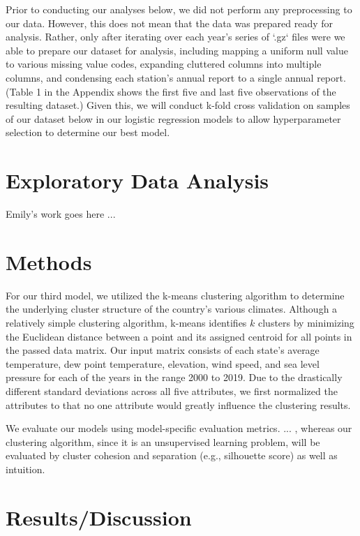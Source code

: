 \documentclass[conference]{IEEEtran}
\begin{document}
Prior to conducting our analyses below, we did not perform any preprocessing to our data. However, this does not mean that the data was prepared ready for analysis. Rather, only after iterating over each year's series of `.gz` files were we able to prepare our dataset for analysis, including mapping a uniform null value to various missing value codes, expanding cluttered columns into multiple columns, and condensing each station's annual report to a single annual report. (Table 1 in the Appendix shows the first five and last five observations of the resulting dataset.) Given this, we will conduct k-fold cross validation on samples of our dataset below in our logistic regression models to allow hyperparameter selection to determine our best model.

\section{Exploratory Data Analysis}

Emily's work goes here ...

\section{Methods}

For our third model, we utilized the k-means clustering algorithm to determine the underlying cluster structure of the country's various climates. Although a relatively simple clustering algorithm, k-means identifies $k$ clusters by minimizing the Euclidean distance between a point and its assigned centroid for all points in the passed data matrix. Our input matrix consists of each state's average temperature, dew point temperature, elevation, wind speed, and sea level pressure for each of the years in the range 2000 to 2019. Due to the drastically different standard deviations across all five attributes, we first normalized the attributes to that no one attribute would greatly influence the clustering results.

We evaluate our models using model-specific evaluation metrics. ... , whereas our clustering algorithm, since it is an unsupervised learning problem, will be evaluated by cluster cohesion and separation (e.g., silhouette score) as well as intuition.

\section{Results/Discussion}
\end{document}
